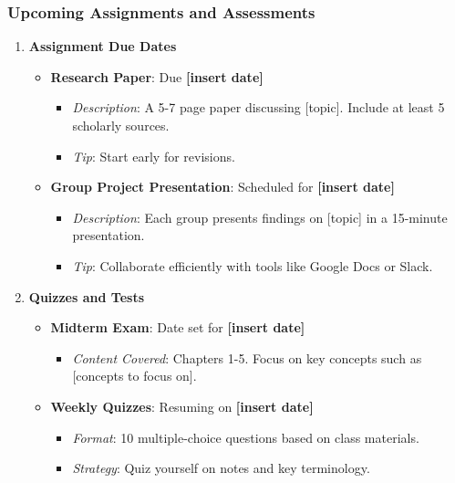 \documentclass[aspectratio=169]{beamer}
\begin{document}
\begin{frame}[fragile]
    \frametitle{Upcoming Assignments and Assessments}
    \begin{enumerate}
        \item \textbf{Assignment Due Dates}
        \begin{itemize}
            \item \textbf{Research Paper}: Due \textbf{[insert date]}  
            \begin{itemize}
                \item \textit{Description}: A 5-7 page paper discussing [topic]. Include at least 5 scholarly sources.
                \item \textit{Tip}: Start early for revisions.
            \end{itemize}
            \item \textbf{Group Project Presentation}: Scheduled for \textbf{[insert date]}  
            \begin{itemize}
                \item \textit{Description}: Each group presents findings on [topic] in a 15-minute presentation.
                \item \textit{Tip}: Collaborate efficiently with tools like Google Docs or Slack.
            \end{itemize}
        \end{itemize}
        
        \item \textbf{Quizzes and Tests}
        \begin{itemize}
            \item \textbf{Midterm Exam}: Date set for \textbf{[insert date]}  
            \begin{itemize}
                \item \textit{Content Covered}: Chapters 1-5. Focus on key concepts such as [concepts to focus on].
            \end{itemize}
            \item \textbf{Weekly Quizzes}: Resuming on \textbf{[insert date]}  
            \begin{itemize}
                \item \textit{Format}: 10 multiple-choice questions based on class materials.
                \item \textit{Strategy}: Quiz yourself on notes and key terminology.
            \end{itemize}
        \end{itemize}
    \end{enumerate}
\end{frame}
\end{document}
